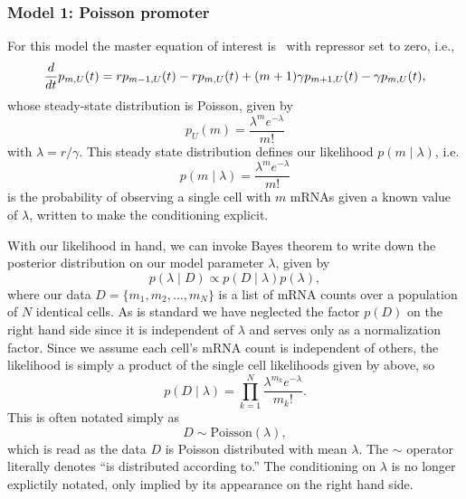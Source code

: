 \subsubsection{Model 1: Poisson promoter}
For this model the master equation of interest is~
with repressor set to zero, i.e.,
\begin{equation}
\frac{d {}}{d t}p_{m,U}(t) = rp_{m-1,U}(t) - rp_{m,U}(t)
        + (m+1)\gamma p_{m+1,U}(t) - \gamma p_{m,U}(t),
\end{equation}
whose steady-state distribution is Poisson, given by
\begin{equation}
p_U(m) = \frac{\lambda^m e^{-\lambda}}{m!}
\end{equation}
with $\lambda=r/\gamma$. This steady state distribution defines our likelihood
$p(m\mid\lambda)$, i.e.
\begin{equation}
p(m\mid\lambda) = \frac{\lambda^m e^{-\lambda}}{m!}
\label{eq:poisson_inference010}
\end{equation}
is the probability of observing a single cell with $m$ mRNAs given a known value
of $\lambda$, written to make the conditioning explicit.

With our likelihood in hand, we can invoke Bayes theorem to write down the
posterior distribution on our model parameter $\lambda$, given by
\begin{equation}
p(\lambda\mid D) \propto p(D\mid\lambda) p(\lambda),
\end{equation}
where our data $D=\{m_1, m_2,\dots, m_N\}$ is a list of mRNA counts over a
population of $N$ identical cells. As is standard we have neglected the factor
$p(D)$ on the right hand side since it is independent of $\lambda$ and serves
only as a normalization factor. Since we assume each cell's mRNA count is
independent of others, the likelihood is simply a product of the single cell
likelihoods given by  above, so
\begin{equation}
p(D\mid\lambda) = \prod_{k=1}^N \frac{\lambda^{m_k}e^{-\lambda}}{m_k!}.
\end{equation}
This is often notated simply as
\begin{equation}
D \sim \text{Poisson}(\lambda),
\end{equation}
which is read as the data $D$ is Poisson
distributed with mean $\lambda$. The $\sim$ operator literally denotes ``is
distributed according to.''
The conditioning on $\lambda$ is no longer explictily notated,
only implied by its appearance on the right hand side.

